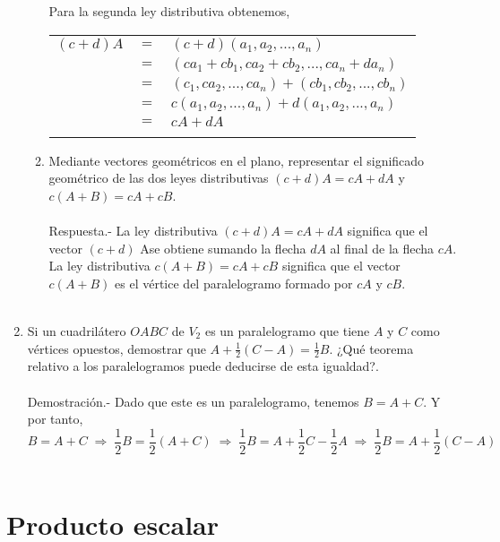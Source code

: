 \begin{enumerate}
\begin{enumerate}[\bfseries a)]
\begin{center}
\begin{tabular}{rcl}
	    \end{tabular}
	\end{center}
	Para la segunda ley distributiva obtenemos,
	\begin{center}
	    \begin{tabular}{rcl}
		$(c+d)A$&$=$&$(c+d)(a_1,a_2,...,a_n)$\\
		&$=$&$(ca_1+cb_1,ca_2+cb_2,...,ca_n+da_n)$\\
		&$=$&$(c_1,ca_2,...,ca_n)+(cb_1,cb_2,...,cb_n)$\\
		&$=$&$c(a_1,a_2,...,a_n)+d(a_1,a_2,...,a_n)$\\
		&$=$&$cA+dA$\\\\
	    \end{tabular}
	\end{center}

    \item Mediante vectores geométricos en el plano, representar el significado geométrico de las dos leyes distributivas $(c+d)A=cA+dA$ y $c(A+B) = cA+cB$.\\\\
	Respuesta.-\; La ley distributiva $(c + d) A = cA + dA$ significa que el vector $(c + d)$ Ase obtiene sumando la flecha $dA$ al final de la flecha $cA$.\\
La ley distributiva $c (A + B) = cA + cB$ significa que el vector $c (A + B)$ es el vértice del paralelogramo formado por $cA$ y $cB$.\\\\

\end{enumerate}

\item Si un cuadrilátero $OABC$ de $V_2$ es un paralelogramo que tiene $A$ y $C$ como vértices opuestos, demostrar que $A+\frac{1}{2}(C-A) =\frac{1}{2}B$. ¿Qué teorema relativo a los paralelogramos puede deducirse de esta igualdad?.\\\\
    Demostración.-\; Dado que este es un paralelogramo, tenemos $B=A+C$. Y por tanto,
    $$B=A+C\; \Longrightarrow\; \dfrac{1}{2}B=\dfrac{1}{2}(A+C)\; \Longrightarrow\; \dfrac{1}{2}B = A + \dfrac{1}{2}C - \dfrac{1}{2} A \;\Longrightarrow \; \dfrac{1}{2}B = A + \dfrac{1}{2}(C-A)$$\\

\end{enumerate}


\section{Producto escalar}

